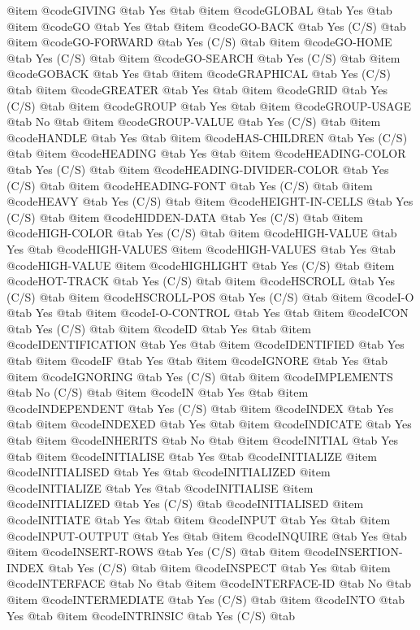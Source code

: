 @item @code{GIVING} @tab Yes @tab 
@item @code{GLOBAL} @tab Yes @tab 
@item @code{GO} @tab Yes @tab 
@item @code{GO-BACK} @tab Yes	(C/S) @tab 
@item @code{GO-FORWARD} @tab Yes	(C/S) @tab 
@item @code{GO-HOME} @tab Yes	(C/S) @tab 
@item @code{GO-SEARCH} @tab Yes	(C/S) @tab 
@item @code{GOBACK} @tab Yes @tab 
@item @code{GRAPHICAL} @tab Yes	(C/S) @tab 
@item @code{GREATER} @tab Yes @tab 
@item @code{GRID} @tab Yes	(C/S) @tab 
@item @code{GROUP} @tab Yes @tab 
@item @code{GROUP-USAGE} @tab No @tab 
@item @code{GROUP-VALUE} @tab Yes	(C/S) @tab 
@item @code{HANDLE} @tab Yes @tab 
@item @code{HAS-CHILDREN} @tab Yes	(C/S) @tab 
@item @code{HEADING} @tab Yes @tab 
@item @code{HEADING-COLOR} @tab Yes	(C/S) @tab 
@item @code{HEADING-DIVIDER-COLOR} @tab Yes	(C/S) @tab 
@item @code{HEADING-FONT} @tab Yes	(C/S) @tab 
@item @code{HEAVY} @tab Yes	(C/S) @tab 
@item @code{HEIGHT-IN-CELLS} @tab Yes	(C/S) @tab 
@item @code{HIDDEN-DATA} @tab Yes	(C/S) @tab 
@item @code{HIGH-COLOR} @tab Yes	(C/S) @tab 
@item @code{HIGH-VALUE} @tab Yes @tab @code{HIGH-VALUES}
@item @code{HIGH-VALUES} @tab Yes @tab @code{HIGH-VALUE}
@item @code{HIGHLIGHT} @tab Yes	(C/S) @tab 
@item @code{HOT-TRACK} @tab Yes	(C/S) @tab 
@item @code{HSCROLL} @tab Yes	(C/S) @tab 
@item @code{HSCROLL-POS} @tab Yes	(C/S) @tab 
@item @code{I-O} @tab Yes @tab 
@item @code{I-O-CONTROL} @tab Yes @tab 
@item @code{ICON} @tab Yes	(C/S) @tab 
@item @code{ID} @tab Yes @tab 
@item @code{IDENTIFICATION} @tab Yes @tab 
@item @code{IDENTIFIED} @tab Yes @tab 
@item @code{IF} @tab Yes @tab 
@item @code{IGNORE} @tab Yes @tab 
@item @code{IGNORING} @tab Yes	(C/S) @tab 
@item @code{IMPLEMENTS} @tab No	(C/S) @tab 
@item @code{IN} @tab Yes @tab 
@item @code{INDEPENDENT} @tab Yes	(C/S) @tab 
@item @code{INDEX} @tab Yes @tab 
@item @code{INDEXED} @tab Yes @tab 
@item @code{INDICATE} @tab Yes @tab 
@item @code{INHERITS} @tab No @tab 
@item @code{INITIAL} @tab Yes @tab 
@item @code{INITIALISE} @tab Yes @tab @code{INITIALIZE}
@item @code{INITIALISED} @tab Yes @tab @code{INITIALIZED}
@item @code{INITIALIZE} @tab Yes @tab @code{INITIALISE}
@item @code{INITIALIZED} @tab Yes	(C/S) @tab @code{INITIALISED}
@item @code{INITIATE} @tab Yes @tab 
@item @code{INPUT} @tab Yes @tab 
@item @code{INPUT-OUTPUT} @tab Yes @tab 
@item @code{INQUIRE} @tab Yes @tab 
@item @code{INSERT-ROWS} @tab Yes	(C/S) @tab 
@item @code{INSERTION-INDEX} @tab Yes	(C/S) @tab 
@item @code{INSPECT} @tab Yes @tab 
@item @code{INTERFACE} @tab No @tab 
@item @code{INTERFACE-ID} @tab No @tab 
@item @code{INTERMEDIATE} @tab Yes	(C/S) @tab 
@item @code{INTO} @tab Yes @tab 
@item @code{INTRINSIC} @tab Yes	(C/S) @tab 

